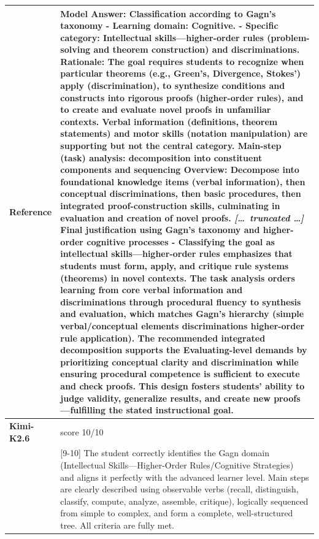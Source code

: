 \begin{longtable}{@{}l p{12.5cm}@{}}
  \textbf{Reference} & Model Answer: \newline Classification according to Gagn's taxonomy \newline - Learning domain: Cognitive. \newline - Specific category: Intellectual skills---higher-order rules (problem-solving and theorem construction) and discriminations. Rationale: The goal requires students to recognize when particular theorems (e.g., Green's, Divergence, Stokes') apply (discrimination), to synthesize conditions and constructs into rigorous proofs (higher-order rules), and to create and evaluate novel proofs in unfamiliar contexts. Verbal information (definitions, theorem statements) and motor skills (notation manipulation) are supporting but not the central category. \newline Main-step (task) analysis: decomposition into constituent components and sequencing \newline Overview: Decompose into foundational knowledge items (verbal information), then conceptual discriminations, then basic procedures, then integrated proof-construction skills, culminating in evaluation and creation of novel proofs. \newline \textit{[\ldots\ truncated \ldots]} \newline Final justification using Gagn's taxonomy and higher-order cognitive processes \newline - Classifying the goal as intellectual skills---higher-order rules emphasizes that students must form, apply, and critique rule systems (theorems) in novel contexts. The task analysis orders learning from core verbal information and discriminations through procedural fluency to synthesis and evaluation, which matches Gagn's hierarchy (simple verbal/conceptual elements discriminations higher-order rule application). The recommended integrated decomposition supports the Evaluating-level demands by prioritizing conceptual clarity and discrimination while ensuring procedural competence is sufficient to execute and check proofs. This design fosters students' ability to judge validity, generalize results, and create new proofs---fulfilling the stated instructional goal. \\
  \midrule
  \textbf{Kimi-K2.6} & score 10/10 \\
  & [9-10] The student correctly identifies the Gagn domain (Intellectual Skills---Higher-Order Rules/Cognitive Strategies) and aligns it perfectly with the advanced learner level. Main steps are clearly described using observable verbs (recall, distinguish, classify, compute, analyze, assemble, critique), logically sequenced from simple to complex, and form a complete, well-structured tree. All criteria are fully met. \\

\end{longtable}
